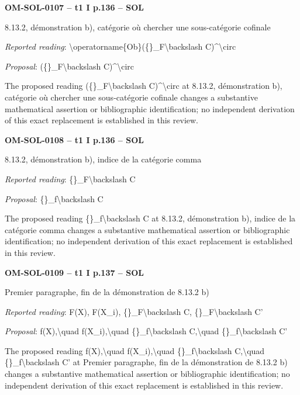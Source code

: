 \par\noindent\textbf{OM-SOL-0107 -- t1 I p.136 -- SOL}\par
8.13.2, démonstration b), catégorie où chercher une sous-catégorie cofinale\par
\emph{Reported reading}: \textbackslash{}operatorname\{Ob\}(\{\}\_F\textbackslash{}backslash C)\textasciicircum{}\textbackslash{}circ\par
\emph{Proposal}: (\{\}\_F\textbackslash{}backslash C)\textasciicircum{}\textbackslash{}circ\par
The proposed reading (\{\}\_F\textbackslash{}backslash C)\textasciicircum{}\textbackslash{}circ at 8.13.2, démonstration b), catégorie où chercher une sous-catégorie cofinale changes a substantive mathematical assertion or bibliographic identification; no independent derivation of this exact replacement is established in this review.\par
\par\noindent\textbf{OM-SOL-0108 -- t1 I p.136 -- SOL}\par
8.13.2, démonstration b), indice de la catégorie comma\par
\emph{Reported reading}: \{\}\_F\textbackslash{}backslash C\par
\emph{Proposal}: \{\}\_f\textbackslash{}backslash C\par
The proposed reading \{\}\_f\textbackslash{}backslash C at 8.13.2, démonstration b), indice de la catégorie comma changes a substantive mathematical assertion or bibliographic identification; no independent derivation of this exact replacement is established in this review.\par
\par\noindent\textbf{OM-SOL-0109 -- t1 I p.137 -- SOL}\par
Premier paragraphe, fin de la démonstration de 8.13.2 b)\par
\emph{Reported reading}: F(X), F(X\_i), \{\}\_F\textbackslash{}backslash C, \{\}\_F\textbackslash{}backslash C'\par
\emph{Proposal}: f(X),\textbackslash{}quad f(X\_i),\textbackslash{}quad \{\}\_f\textbackslash{}backslash C,\textbackslash{}quad \{\}\_f\textbackslash{}backslash C'\par
The proposed reading f(X),\textbackslash{}quad f(X\_i),\textbackslash{}quad \{\}\_f\textbackslash{}backslash C,\textbackslash{}quad \{\}\_f\textbackslash{}backslash C' at Premier paragraphe, fin de la démonstration de 8.13.2 b) changes a substantive mathematical assertion or bibliographic identification; no independent derivation of this exact replacement is established in this review.\par
